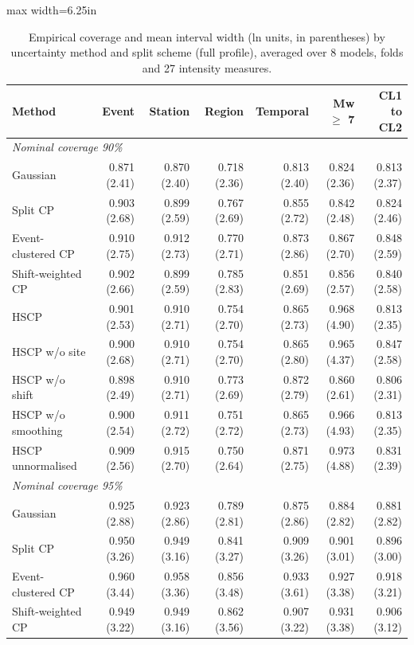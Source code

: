 \begin{table}[htbp]
\centering
\caption{Empirical coverage and mean interval width (ln units, in parentheses) by uncertainty method and split scheme (full profile), averaged over 8 models, folds and 27 intensity measures.}
\label{tab:table4_conformal_ablation}
\small
\begin{adjustbox}{max width=6.25in}
\begin{tabular}{lrrrrrr}
\toprule
Method & Event & Station & Region & Temporal & Mw $\geq$ 7 & CL1 to CL2 \\
\midrule
\multicolumn{7}{l}{\textit{Nominal coverage 90\%}} \\
Gaussian & 0.871 (2.41) & 0.870 (2.40) & 0.718 (2.36) & 0.813 (2.40) & 0.824 (2.36) & 0.813 (2.37) \\
Split CP & 0.903 (2.68) & 0.899 (2.59) & 0.767 (2.69) & 0.855 (2.72) & 0.842 (2.48) & 0.824 (2.46) \\
Event-clustered CP & 0.910 (2.75) & 0.912 (2.73) & 0.770 (2.71) & 0.873 (2.86) & 0.867 (2.70) & 0.848 (2.59) \\
Shift-weighted CP & 0.902 (2.66) & 0.899 (2.59) & 0.785 (2.83) & 0.851 (2.69) & 0.856 (2.57) & 0.840 (2.58) \\
HSCP & 0.901 (2.53) & 0.910 (2.71) & 0.754 (2.70) & 0.865 (2.73) & 0.968 (4.90) & 0.813 (2.35) \\
HSCP w/o site & 0.900 (2.68) & 0.910 (2.71) & 0.754 (2.70) & 0.865 (2.80) & 0.965 (4.37) & 0.847 (2.58) \\
HSCP w/o shift & 0.898 (2.49) & 0.910 (2.71) & 0.773 (2.69) & 0.872 (2.79) & 0.860 (2.61) & 0.806 (2.31) \\
HSCP w/o smoothing & 0.900 (2.54) & 0.911 (2.72) & 0.751 (2.72) & 0.865 (2.73) & 0.966 (4.93) & 0.813 (2.35) \\
HSCP unnormalised & 0.909 (2.56) & 0.915 (2.70) & 0.750 (2.64) & 0.871 (2.75) & 0.973 (4.88) & 0.831 (2.39) \\
\midrule
\multicolumn{7}{l}{\textit{Nominal coverage 95\%}} \\
Gaussian & 0.925 (2.88) & 0.923 (2.86) & 0.789 (2.81) & 0.875 (2.86) & 0.884 (2.82) & 0.881 (2.82) \\
Split CP & 0.950 (3.26) & 0.949 (3.16) & 0.841 (3.27) & 0.909 (3.26) & 0.901 (3.01) & 0.896 (3.00) \\
Event-clustered CP & 0.960 (3.44) & 0.958 (3.36) & 0.856 (3.48) & 0.933 (3.61) & 0.927 (3.38) & 0.918 (3.21) \\
Shift-weighted CP & 0.949 (3.22) & 0.949 (3.16) & 0.862 (3.56) & 0.907 (3.22) & 0.931 (3.38) & 0.906 (3.12) \\

\end{tabular}
\end{adjustbox}
\end{table}
